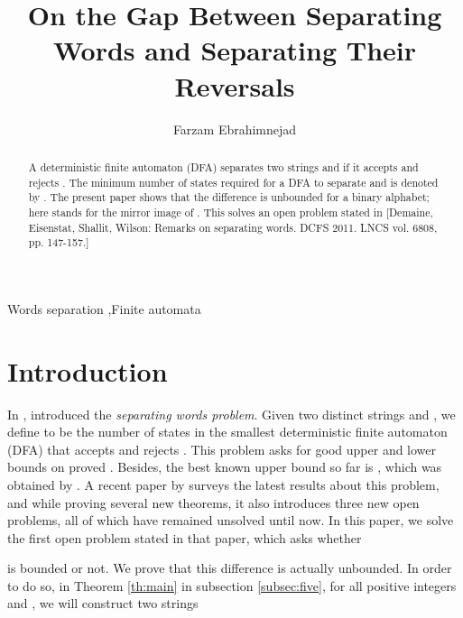 \documentclass[preprint, 12pt]{elsarticle}
\begin{document}
\begin{frontmatter}
\title{On the Gap Between Separating Words and Separating Their Reversals}

	\author[farzam]{Farzam Ebrahimnejad}

	\address[farzam]{Department of Computer Engineering, Sharif University of Technology, Tehran, Iran}
	\begin{abstract}
	A deterministic finite automaton (DFA) separates two strings  and  
if it accepts  and rejects .
The minimum number of states required 
for a DFA to separate  and  is denoted by .
The present paper shows that the difference  
is unbounded for a binary alphabet; 
here  stands for the mirror image of . 
This solves an open problem stated in 
[Demaine, Eisenstat, Shallit, Wilson: Remarks on separating words. 
DCFS 2011. LNCS vol. 6808, pp. 147-157.]
	\end{abstract}
	\begin{keyword}
		Words separation \sep Finite automata
	\end{keyword}


\end{frontmatter}


	
\section{Introduction}
	
	In \citeyear{goralvcik1986discerning2}, \citet*{goralvcik1986discerning2} introduced the \textit{separating words problem}. Given two distinct strings  and , we define  to be the number of states in the smallest deterministic finite automaton (DFA) that accepts  and rejects  \cite{demaine2011remarks2}. This problem asks for good upper and lower bounds on 
	\citet{goralvcik1986discerning2} proved . Besides, the best known upper bound so far is , which was obtained by \citet*{Robson89,Robson96}. A recent paper by \citet*{demaine2011remarks2} surveys the latest results about this problem, and while proving several new theorems, it also introduces three new open problems, all of which have remained unsolved until now. In this paper, we solve the first open problem stated in that paper, which asks whether 
	
	is bounded or not. We prove that this difference is actually unbounded. In order to do so, in Theorem \ref{th:main} in subsection \ref{subsec:five}, for all positive integers  and , we will construct two strings 	
	
\end{document}
